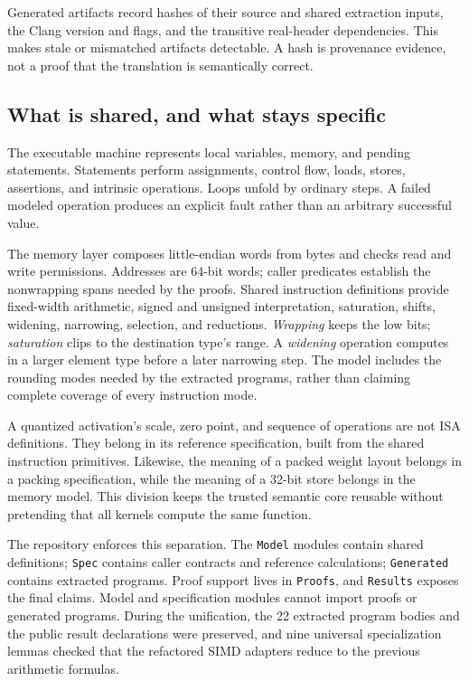 \documentclass[11pt]{article}
\newcommand{\code}[1]{{\small\texttt{#1}}}
\begin{document}
Generated artifacts record hashes of their source and shared extraction inputs, the Clang version and flags, and the transitive real-header dependencies. This makes stale or mismatched artifacts detectable. A hash is provenance evidence, not a proof that the translation is semantically correct.

\subsection{What is shared, and what stays specific}
The executable machine represents local variables, memory, and pending statements. Statements perform assignments, control flow, loads, stores, assertions, and intrinsic operations. Loops unfold by ordinary steps. A failed modeled operation produces an explicit fault rather than an arbitrary successful value.

The memory layer composes little-endian words from bytes and checks read and write permissions. Addresses are 64-bit words; caller predicates establish the nonwrapping spans needed by the proofs. Shared instruction definitions provide fixed-width arithmetic, signed and unsigned interpretation, saturation, shifts, widening, narrowing, selection, and reductions. \emph{Wrapping} keeps the low bits; \emph{saturation} clips to the destination type's range. A \emph{widening} operation computes in a larger element type before a later narrowing step. The model includes the rounding modes needed by the extracted programs, rather than claiming complete coverage of every instruction mode.

A quantized activation's scale, zero point, and sequence of operations are not ISA definitions. They belong in its reference specification, built from the shared instruction primitives. Likewise, the meaning of a packed weight layout belongs in a packing specification, while the meaning of a 32-bit store belongs in the memory model. This division keeps the trusted semantic core reusable without pretending that all kernels compute the same function.

The repository enforces this separation. The \code{Model} modules contain shared definitions; \code{Spec} contains caller contracts and reference calculations; \code{Generated} contains extracted programs. Proof support lives in \code{Proofs}, and \code{Results} exposes the final claims. Model and specification modules cannot import proofs or generated programs. During the unification, the 22 extracted program bodies and the public result declarations were preserved, and nine universal specialization lemmas checked that the refactored SIMD adapters reduce to the previous arithmetic formulas.
\end{document}
